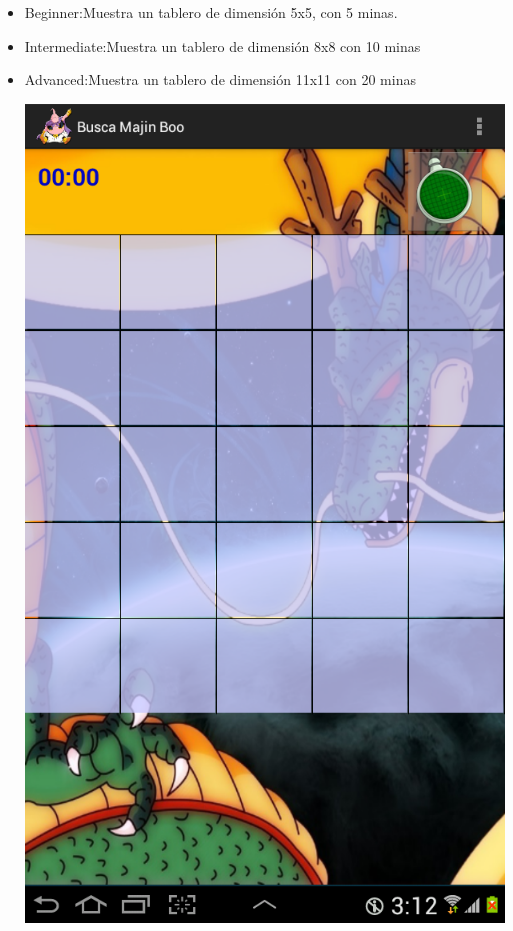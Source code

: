 \documentclass[11pt]{article} %
\begin{document}
\begin{itemize}
\item Beginner:Muestra un tablero de dimensión 5x5, con 5 minas.
\item Intermediate:Muestra un tablero de dimensión 8x8 con 10 minas
\item Advanced:Muestra un tablero de dimensión 11x11 con 20 minas 
\begin{center}
\includegraphics[scale=0.2]{Imagenes/SSEasy.png}

\end{center}
\end{itemize}
\end{document}
